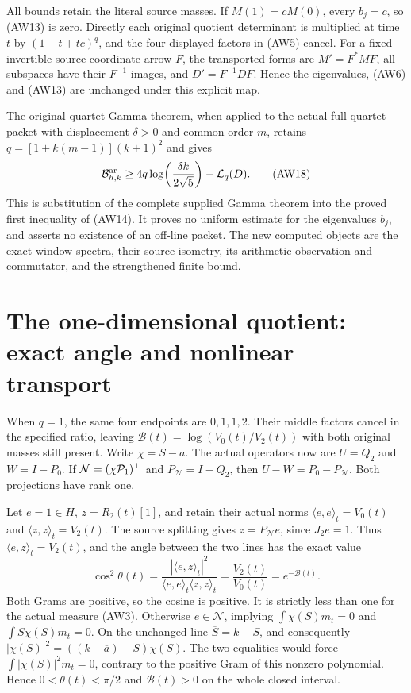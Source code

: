 All bounds retain the literal source masses. If $M(1)=cM(0)$,
every $b_j=c$, so (AW13) is zero. Directly each original
quotient determinant is multiplied at time $t$ by
$(1-t+tc)^q$, and the four displayed factors in (AW5) cancel.
For a fixed invertible source-coordinate arrow $F$, the transported
forms are $M'=F^*MF$, all subspaces have their $F^{-1}$ images,
and $D'=F^{-1}DF$. Hence the eigenvalues, (AW6) and (AW13)
are unchanged under this explicit map.

The original quartet Gamma theorem, when applied to the actual
full quartet packet with displacement $\delta>0$ and common
order $m$, retains $q=[1+k(m-1)](k+1)^2$ and gives
\[
 \mathcal B^{\rm ar}_{h,k}
 \ge4q\log\!\left(\frac{\delta k}{2\sqrt5}\right)
             -\mathcal L_q(D).
 \tag{AW18}
\]
This is substitution of the complete supplied Gamma theorem
into the proved first inequality of (AW14). It proves no
uniform estimate for the eigenvalues $b_j$, and asserts no
existence of an off-line packet. The new computed objects are
the exact window spectra, their source isometry, its arithmetic
observation and commutator, and the strengthened finite bound.

\section[The one-dimensional quotient: exact angle and nonlinear transport]{The one-dimensional quotient:\\exact angle and nonlinear transport}

When $q=1$, the same four endpoints are $0,1,1,2$. Their
middle factors cancel in the specified ratio, leaving
$\mathcal B(t)=\log(V_0(t)/V_2(t))$ with both original masses
still present. Write $\chi=S-a$. The actual operators now are
$U=Q_2$ and $W=I-P_0$. If $\mathcal N=(\chi\mathcal P_1)^\perp$
and $P_{\mathcal N}=I-Q_2$, then
$U-W=P_0-P_{\mathcal N}$. Both projections have rank one.

Let $e=1\in H$, $z=R_2(t)[1]$, and retain their actual norms
$\langle e,e\rangle_t=V_0(t)$ and
$\langle z,z\rangle_t=V_2(t)$. The source splitting gives
$z=P_{\mathcal N}e$, since $J_2e=1$. Thus
$\langle e,z\rangle_t=V_2(t)$, and the angle between the
two lines has the exact value
\[
 \cos^2\theta(t)=\frac{|\langle e,z\rangle_t|^2}
                         {\langle e,e\rangle_t\langle z,z\rangle_t}
       =\frac{V_2(t)}{V_0(t)}=e^{-\mathcal B(t)}.
 \tag{AW19}
\]
Both Grams are positive, so the cosine is positive. It is
strictly less than one for the actual measure (AW3).
Otherwise $e\in\mathcal N$, implying
$\int\chi(S)m_t=0$ and $\int S\chi(S)m_t=0$.
On the unchanged line $\overline S=k-S$, and consequently
$|\chi(S)|^2=((k-\overline a)-S)\chi(S)$.
The two equalities would force $\int|\chi(S)|^2m_t=0$,
contrary to the positive Gram of this nonzero polynomial.
Hence $0<\theta(t)<\pi/2$ and $\mathcal B(t)>0$ on the
whole closed interval.

